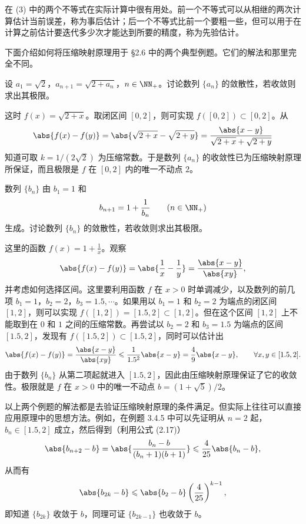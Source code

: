 \begin{xremark}
在 (3) 中的两个不等式在实际计算中很有用处。前一个不等式可以从相继的两次计算估计当前误差，称为事后估计；后一个不等式比前一个要粗一些，但可以用于在计算之前估计要迭代多少次才能达到所要的精度，称为先验估计。
\end{xremark}

下面介绍如何将压缩映射原理用于 §2.6 中的两个典型例题。它们的解法和那里完全不同。

\begin{xexample}[3.4.4]
设 $a_1=\sqrt2$，$a_{n+1}=\sqrt{2+a_n}$，$n\in\NN_+$。讨论数列 $\{a_n\}$ 的敛散性，若收敛则求出其极限。
\end{xexample}
\begin{xsolution}
这时 $f(x)=\sqrt{2+x}$。取闭区间 $[0,2]$，则可实现 $f([0,2])\subset[0,2]$。从
\[
  \abs{f(x)-f(y)}=\abs{\sqrt{2+x}-\sqrt{2+y}}
  =\frac{\abs{x-y}}{\sqrt{2+x}+\sqrt{2+y}}
\]
知道可取 $k=1/(2\sqrt2)$ 为压缩常数。于是数列 $\{a_n\}$ 的收敛性已为压缩映射原理所保证，而且极限是 $f$ 在 $[0,2]$ 内的唯一不动点 $2$。
\end{xsolution}

\begin{xexample}[3.4.5]
数列 $\{b_n\}$ 由 $b_1=1$ 和
\[
  b_{n+1}=1+\frac1{b_n}\qquad(n\in\NN_+)
\]
生成。讨论数列 $\{b_n\}$ 的敛散性，若收敛则求出其极限。
\end{xexample}
\begin{xsolution}
这里的函数 $f(x)=1+\frac1x$。观察
\[
  \abs{f(x)-f(y)}=\abs{\frac1x-\frac1y}=\frac{\abs{x-y}}{\abs{xy}},
\]
并考虑如何选择区间。这里要利用函数 $f$ 在 $x>0$ 时单调减少，以及数列的前几项 $b_1=1$，$b_2=2$，$b_3=1.5,\cdots$。如果用以 $b_1=1$ 和 $b_2=2$ 为端点的闭区间 $[1,2]$，则可以实现 $f([1,2])=[1.5,2]\subset[1,2]$。但在这个区间 $[1,2]$ 上不能取到在 $0$ 和 $1$ 之间的压缩常数。再尝试以 $b_2=2$ 和 $b_3=1.5$ 为端点的区间 $[1.5,2]$，发现有 $f([1.5,2])\subset[1.5,2]$，同时可以估计出
\[
  \abs{f(x)-f(y)}=\frac{\abs{x-y}}{\abs{xy}}\leqslant\frac1{1.5^2}\abs{x-y}
  =\frac49\abs{x-y},\qquad \forall x,y\in[1.5,2].
\]
由于数列 $\{b_n\}$ 从第二项起就进入 $[1.5,2]$，因此由压缩映射原理保证了它的收敛性。极限就是 $f$ 在 $x>0$ 中的唯一不动点 $b=(1+\sqrt5)/2$。
\end{xsolution}

\begin{xremark}
以上两个例题的解法都是去验证压缩映射原理的条件满足。但实际上往往可以直接应用原理中的思想方法。例如，在例题 3.4.5 中可以先证明从 $n=2$ 起，$b_n\in[1.5,2]$ 成立，然后得到（利用公式 (2.17)）
\[
  \abs{b_{n+2}-b}=\abs{\frac{b_n-b}{(b_n+1)(b+1)}}\leqslant\frac4{25}\abs{b_n-b},
\]
从而有
\[
  \abs{b_{2k}-b}\leqslant\abs{b_2-b}\left(\frac4{25}\right)^{k-1},
\]
即知道 $\{b_{2k}\}$ 收敛于 $b$，同理可证 $\{b_{2k-1}\}$ 也收敛于 $b$。
\end{xremark}

